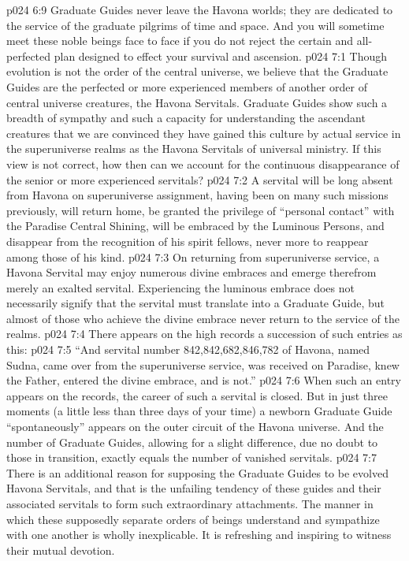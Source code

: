 \vs p024 6:9 \pc Graduate Guides never leave the Havona worlds; they are dedicated to the service of the graduate pilgrims of time and space. And you will sometime meet these noble beings face to face if you do not reject the certain and all\hyp{}perfected plan designed to effect your survival and ascension.
\vs p024 7:1 Though evolution is not the order of the central universe, we believe that the Graduate Guides are the perfected or more experienced members of another order of central universe creatures, the Havona Servitals. Graduate Guides show such a breadth of sympathy and such a capacity for understanding the ascendant creatures that we are convinced they have gained this culture by actual service in the superuniverse realms as the Havona Servitals of universal ministry. If this view is not correct, how then can we account for the continuous disappearance of the senior or more experienced servitals?
\vs p024 7:2 A servital will be long absent from Havona on superuniverse assignment, having been on many such missions previously, will return home, be granted the privilege of “personal contact” with the Paradise Central Shining, will be embraced by the Luminous Persons, and disappear from the recognition of his spirit fellows, never more to reappear among those of his kind.
\vs p024 7:3 On returning from superuniverse service, a Havona Servital may enjoy numerous divine embraces and emerge therefrom merely an exalted servital. Experiencing the luminous embrace does not necessarily signify that the servital must translate into a Graduate Guide, but almost  of those who achieve the divine embrace never return to the service of the realms.
\vs p024 7:4 \pc There appears on the high records a succession of such entries as this:
\vs p024 7:5 “And servital number 842,842,682,846,782 of Havona, named Sudna, came over from the superuniverse service, was received on Paradise, knew the Father, entered the divine embrace, and is not.”
\vs p024 7:6 When such an entry appears on the records, the career of such a servital is closed. But in just three moments (a little less than three days of your time) a newborn Graduate Guide “spontaneously” appears on the outer circuit of the Havona universe. And the number of Graduate Guides, allowing for a slight difference, due no doubt to those in transition, exactly equals the number of vanished servitals.
\vs p024 7:7 \pc There is an additional reason for supposing the Graduate Guides to be evolved Havona Servitals, and that is the unfailing tendency of these guides and their associated servitals to form such extraordinary attachments. The manner in which these supposedly separate orders of beings understand and sympathize with one another is wholly inexplicable. It is refreshing and inspiring to witness their mutual devotion.
